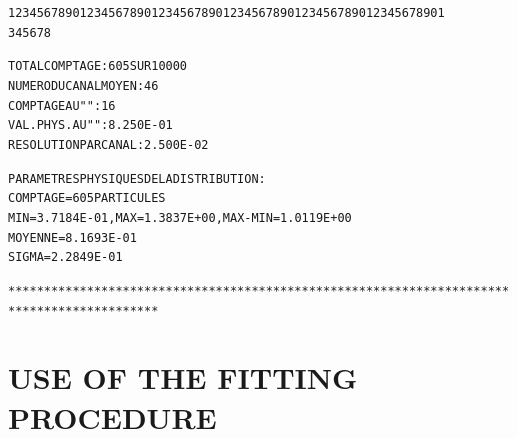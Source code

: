 \begin{alltt}
                              1234567890123456789012345678901234567890123456789012345678901
                                       3         4         5         6         7         8


                TOTAL  COMPTAGE                 :     605  SUR  10000
                NUMERO   DU  CANAL  MOYEN       :      46
                COMPTAGE  AU   "      "         :      16
                VAL. PHYS. AU  "      "         :  8.250E-01      
                RESOLUTION  PAR  CANAL          :  2.500E-02      

                PARAMETRES  PHYSIQUES  DE  LA  DISTRIBUTION :
                              COMPTAGE =    605  PARTICULES
                              MIN =  3.7184E-01, MAX =  1.3837E+00, MAX-MIN =  1.0119E+00      
                              MOYENNE =  8.1693E-01      
                              SIGMA =  2.2849E-01      

*******************************************************************************************
\end{alltt}
\onecolumn

\normalsize

 \clearpage






\section{USE OF THE FITTING PROCEDURE}
\vfill

